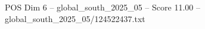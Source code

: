 \begin{textsample}{POS Dim 6 – global\_south\_2025\_05 – Score 11.00 – global\_south\_2025\_05/124522437.txt}
\end{textsample}
